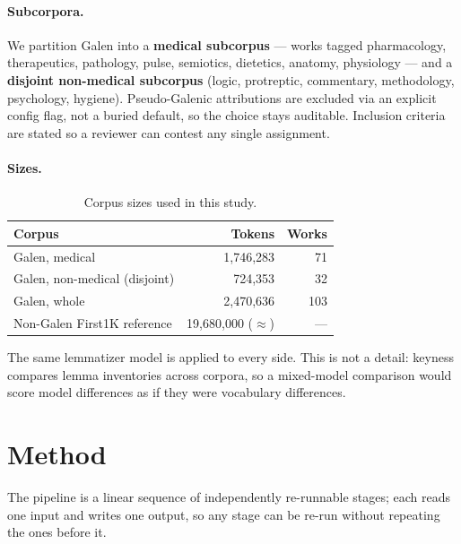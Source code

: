 \documentclass[11pt]{article}
\begin{document}
\paragraph{Subcorpora.}
We partition Galen into a \textbf{medical subcorpus} --- works tagged pharmacology,
therapeutics, pathology, pulse, semiotics, dietetics, anatomy, physiology --- and a \textbf{disjoint
non-medical subcorpus} (logic, protreptic, commentary, methodology, psychology, hygiene).
Pseudo-Galenic attributions are excluded via an explicit config flag, not a buried default, so the
choice stays auditable. Inclusion criteria are stated so a reviewer can contest any single
assignment.

\paragraph{Sizes.}

\begin{table}[t]
\centering
\begin{tabular}{lrr}
\toprule
\textbf{Corpus} & \textbf{Tokens} & \textbf{Works} \\
\midrule
Galen, medical & 1{,}746{,}283 & 71 \\
Galen, non-medical (disjoint) & 724{,}353 & 32 \\
Galen, whole & 2{,}470{,}636 & 103 \\
Non-Galen First1K reference & 19{,}680{,}000 ($\approx$) & --- \\
\bottomrule
\end{tabular}
\caption{Corpus sizes used in this study.}
\label{tab:sizes}
\end{table}

The same lemmatizer model is applied to every side. This is not a detail: keyness compares lemma
inventories across corpora, so a mixed-model comparison would score model differences as if they
were vocabulary differences.

\section{Method}
\label{sec:method}

The pipeline is a linear sequence of independently re-runnable stages; each reads one input and
writes one output, so any stage can be re-run without repeating the ones before it.
\end{document}
